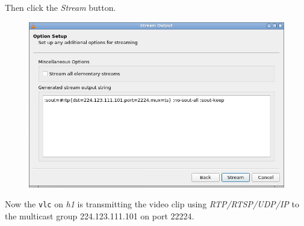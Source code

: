 \documentclass{../UTNetLab}
\begin{document}
    Then click the \textit{Stream} button.
    \begin{figure}[H]
        \centering
        \includegraphics[scale=1.6]{img/stream5}
    \end{figure}
    Now the \lstinline{vlc} on \textit{h1} is transmitting the video clip using \textit{RTP/RTSP/UDP/IP} to the multicast group {224.123.111.101} on port {22224}. 
\end{document}
